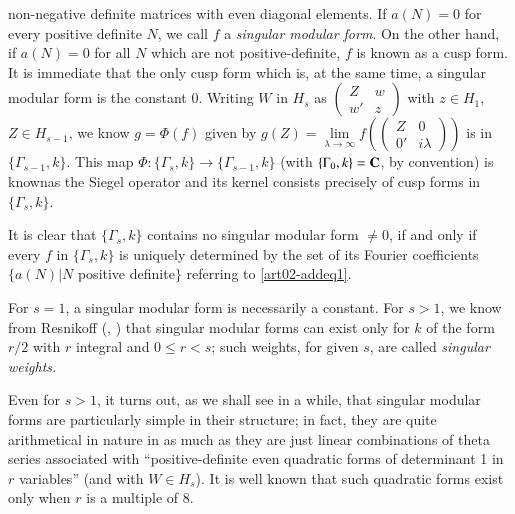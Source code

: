 non-negative definite matrices with even diagonal elements. If
$a(N)=0$ for every positive definite $N$, we call $f$ a {\em singular
modular form}. On the other hand, if $a(N)=0$ for all $N$ which are
not positive-definite, $f$ is known as a cusp form. It is immediate
that the only cusp form which is, at the same time, a singular modular
form is the constant $0$. Writing $W$ in $H_{s}$ as
$\left(\begin{smallmatrix} Z & w\\ w' & z\end{smallmatrix}\right)$
with $z\in H_{1}$, $Z\in H_{s-1}$, we know $g=\Phi(f)$ given by
$g(Z)=\lim\limits_{\lambda\to \infty}f\left(\left(\begin{smallmatrix}
Z & 0\\ 0' & i\lambda\end{smallmatrix}\right)\right)$ is in
$\{\Gamma_{s-1},k\}$. This map
$\Phi:\{\Gamma_{s},k\}\to \{\Gamma_{s-1},k\}$ (with
$\{\Gamma_{0},k\}=\mathbf{C}$, by convention) is known\pageoriginale as the
Siegel operator and its kernel consists precisely of cusp forms in
$\{\Gamma_{s},k\}$. 

It is clear that $\{\Gamma_{s},k\}$ contains no singular modular form
$\neq 0$, if and only if every $f$ in $\{\Gamma_{s},k\}$ is uniquely
determined by the set of its Fourier coefficients $\{a(N)|N$ positive
definite$\}$ referring to \eqref{art02-addeq1}.

For $s=1$, a singular modular form is necessarily a constant. For
$s>1$, we know from Resnikoff (\cite{art02-key3}, \cite{art02-key4})
that singular modular forms can exist only for $k$ of the form $r/2$
with $r$ integral and $0\leq r<s$; such weights, for given $s$, are
called {\em singular weights.}

Even for $s>1$, it turns out, as we shall see in a while, that
singular modular forms are particularly simple in their structure; in
fact, they are quite arithmetical in nature in as much as they are
just linear combinations of theta series associated with
``positive-definite even quadratic forms of determinant 1 in $r$
variables'' (and with $W\in H_{s}$). It is well known that such
quadratic forms exist only when $r$ is a multiple of $8$.


